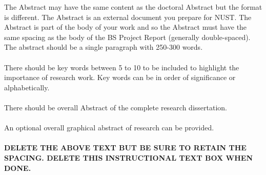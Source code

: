 \documentclass[a4paper,12pt,one side]{report}
\theoremstyle{definition}
\begin{document}
\begin{tcolorbox}[enhanced jigsaw,
    sharp corners,
    boxrule=0.5pt, 
    colback=blue!30!white,   
    borderline={0.5pt}{-2pt}{black,solid} %
 ]
 \begin{justify}
 The Abstract may have the same content as the doctoral Abstract but the format is different. The Abstract is an external document you prepare for NUST. The Abstract is part of the body of your work and so the Abstract must have the same spacing as the body of the BS Project Report (generally double-spaced). The abstract should be a single paragraph with 250-300 words.\\~\\
There should be key words between 5 to 10 to be included to highlight the importance of research work. Key words can be in order of significance or alphabetically.\\~\\
There should be overall Abstract of the complete research dissertation.\\~\\ 
An optional overall graphical abstract of research can be provided.\\~\\
\bf{DELETE THE ABOVE TEXT BUT BE SURE TO RETAIN THE SPACING.}
{\bf DELETE THIS INSTRUCTIONAL TEXT BOX WHEN DONE.}
\end{justify}
\end{tcolorbox}

\pagebreak
{}
\end{document}
